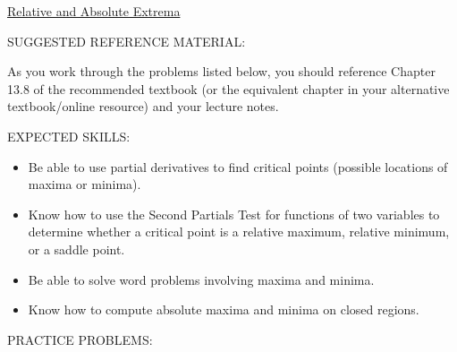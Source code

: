 \documentclass[12pt]{article}
\begin{document}
\begin{center}
\underline{\LARGE{Relative and Absolute Extrema}}
\end{center}

\noindent SUGGESTED REFERENCE MATERIAL:

\bigskip

\noindent As you work through the problems listed below, you should reference Chapter 13.8 of the recommended textbook (or the equivalent chapter in your alternative textbook/online resource) and your lecture notes.

\bigskip

\noindent EXPECTED SKILLS:

\begin{itemize}

\item Be able to use partial derivatives to find critical points (possible locations of maxima or minima). 

\item Know how to use the Second Partials Test for functions of two variables to determine whether a critical point is a relative
maximum, relative minimum, or a saddle point. 

\item Be able to solve word problems involving maxima and minima. 

\item Know how to compute absolute maxima and minima on closed regions.

\end{itemize}

\noindent PRACTICE PROBLEMS:

\medskip

\end{document}
